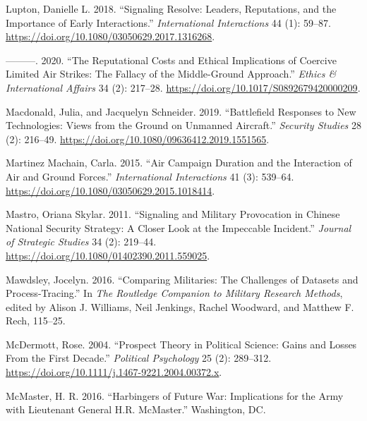 \documentclass[
]{article}
\newlength{\cslhangindent}
\newlength{\cslentryspacingunit} %
\newenvironment{CSLReferences}[2] %
 {%
  \setlength{\parindent}{0pt}
  \ifodd #1
  \let\oldpar\par
  \def\par{\hangindent=\cslhangindent\oldpar}
  \fi
  \setlength{\parskip}{#2\cslentryspacingunit}
 }%
 {}
\begin{document}
\begin{CSLReferences}{1}{0}
\leavevmode{}%
Lupton, Danielle L. 2018. {``Signaling {Resolve}: {Leaders}, {Reputations}, and the {Importance} of {Early Interactions}.''} \emph{International Interactions} 44 (1): 59--87. \url{https://doi.org/10.1080/03050629.2017.1316268}.

\leavevmode{}%
---------. 2020. {``The {Reputational Costs} and {Ethical Implications} of {Coercive Limited Air Strikes}: {The Fallacy} of the {Middle-Ground Approach}.''} \emph{Ethics \& International Affairs} 34 (2): 217--28. \url{https://doi.org/10.1017/S0892679420000209}.

\leavevmode{}%
Macdonald, Julia, and Jacquelyn Schneider. 2019. {``Battlefield {Responses} to {New Technologies}: {Views} from the {Ground} on {Unmanned Aircraft}.''} \emph{Security Studies} 28 (2): 216--49. \url{https://doi.org/10.1080/09636412.2019.1551565}.

\leavevmode{}%
Martinez Machain, Carla. 2015. {``Air {Campaign Duration} and the {Interaction} of {Air} and {Ground Forces}.''} \emph{International Interactions} 41 (3): 539--64. \url{https://doi.org/10.1080/03050629.2015.1018414}.

\leavevmode{}%
Mastro, Oriana Skylar. 2011. {``Signaling and {Military Provocation} in {Chinese National Security Strategy}: {A Closer Look} at the {Impeccable Incident}.''} \emph{Journal of Strategic Studies} 34 (2): 219--44. \url{https://doi.org/10.1080/01402390.2011.559025}.

\leavevmode{}%
Mawdsley, Jocelyn. 2016. {``Comparing {Militaries}: {The Challenges} of {Datasets} and {Process-Tracing}.''} In \emph{The {Routledge Companion} to {Military Research Methods}}, edited by Alison J. Williams, Neil Jenkings, Rachel Woodward, and Matthew F. Rech, 115--25.

\leavevmode{}%
McDermott, Rose. 2004. {``Prospect {Theory} in {Political Science}: {Gains} and {Losses From} the {First Decade}.''} \emph{Political Psychology} 25 (2): 289--312. \url{https://doi.org/10.1111/j.1467-9221.2004.00372.x}.

\leavevmode{}%
McMaster, H. R. 2016. {``Harbingers of {Future War}: {Implications} for the {Army} with {Lieutenant General H}.{R}. {McMaster}.''} {Washington, DC}.


\end{CSLReferences}
\end{document}
